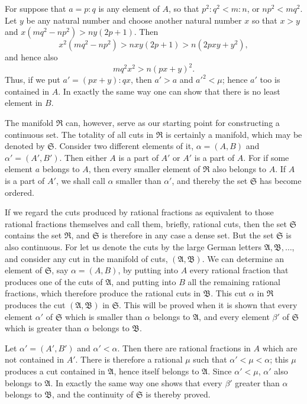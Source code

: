 \documentclass[11pt]{article}
\begin{document}
For suppose that $a=p:q$ is any element of $A$, so that $p^2:q^2<m:n$, or $np^2<mq^2$. Let $y$ be any natural number and choose another natural number $x$ so that $x>y$ and $x(mq^2-np^2)>ny(2p+1)$. Then
\[
 x^2(mq^2-np^2)>nxy(2p+1)>n(2pxy+y^2),
\]
and hence also
\[
 mq^2x^2>n(px+y)^2.
\]
Thus, if we put $a'=(px+y):qx$, then $a'>a$ and $a'^2<\mu$; hence $a'$ too is contained in $A$. In exactly the same way one can show that there is no least element in $B$.

The manifold $\mathfrak R$ can, however, serve as our starting point for constructing a continuous set. The totality of all cuts in $\mathfrak R$ is certainly a manifold, which may be denoted by $\mathfrak S$. Consider two different elements of it, $\alpha=(A,B)$ and $\alpha'=(A',B')$. Then either $A$ is a part of $A'$ or $A'$ is a part of $A$. For if some element $a$ belongs to $A$, then every smaller element of $\mathfrak R$ also belongs to $A$. If $A$ is a part of $A'$, we shall call $\alpha$ smaller than $\alpha'$, and thereby the set $\mathfrak S$ has become ordered.

If we regard the cuts produced by rational fractions as equivalent to those rational fractions themselves and call them, briefly, rational cuts, then the set $\mathfrak S$ contains the set $\mathfrak R$, and $\mathfrak S$ is therefore in any case a dense set. But the set $\mathfrak S$ is also continuous. For let us denote the cuts by the large German letters $\mathfrak A,\mathfrak B,\ldots$, and consider any cut in the manifold of cuts, $(\mathfrak A,\mathfrak B)$. We can determine an element of $\mathfrak S$, say $\alpha=(A,B)$, by putting into $A$ every rational fraction that produces one of the cuts of $\mathfrak A$, and putting into $B$ all the remaining rational fractions, which therefore produce the rational cuts in $\mathfrak B$. This cut $\alpha$ in $\mathfrak R$ produces the cut $(\mathfrak A,\mathfrak B)$ in $\mathfrak S$. This will be proved when it is shown that every element $\alpha'$ of $\mathfrak S$ which is smaller than $\alpha$ belongs to $\mathfrak A$, and every element $\beta'$ of $\mathfrak S$ which is greater than $\alpha$ belongs to $\mathfrak B$.

Let $\alpha'=(A',B')$ and $\alpha'<\alpha$. Then there are rational fractions in $A$ which are not contained in $A'$. There is therefore a rational $\mu$ such that $\alpha'<\mu<\alpha$; this $\mu$ produces a cut contained in $\mathfrak A$, hence itself belongs to $\mathfrak A$. Since $\alpha'<\mu$, $\alpha'$ also belongs to $\mathfrak A$. In exactly the same way one shows that every $\beta'$ greater than $\alpha$ belongs to $\mathfrak B$, and the continuity of $\mathfrak S$ is thereby proved.
\end{document}
